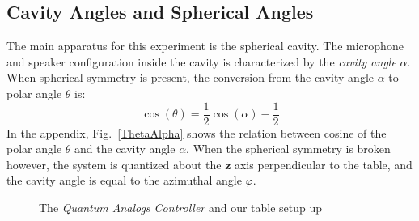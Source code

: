 \documentclass[12pt]{article}
\renewcommand{\vec}[1]{\mathbf{#1}} %
\newcommand{\figref}[1]{Fig.\ \ref{#1}}
\begin{document}
	\subsection{Cavity Angles and Spherical Angles}
	The main apparatus for this experiment is the spherical cavity. The microphone and speaker configuration inside the cavity is characterized by the \emph{cavity angle} $\alpha$. When spherical symmetry is present, the conversion from the cavity angle $\alpha$ to polar angle $\theta$ is:
		\begin{equation}
		\label{alpha2theta}
		\cos(\theta) = \frac{1}{2}\cos(\alpha) - \frac{1}{2}
		\end{equation}
	In the appendix, \figref{ThetaAlpha} shows the relation between cosine of the polar angle $\theta$ and the cavity angle $\alpha$. When the spherical symmetry is broken however, the system is quantized about the $\vec{z}$ axis perpendicular to the table, and the cavity angle is equal to the azimuthal angle $\varphi$.
	
	\begin{figure}[H]
		\captionsetup{justification = centering}
		\centering
		\qquad
		\caption{The \emph{Quantum Analogs Controller} \protect{} and our table setup up \protect{}}
		\label{experiment}
	\end{figure}

	
\end{document}
